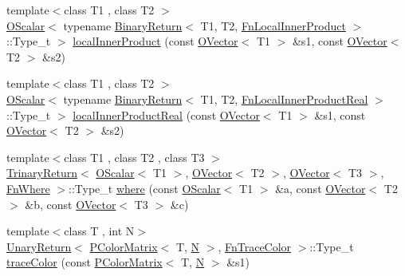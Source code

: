 \begin{DoxyCompactItemize}
\item 
{\footnotesize template$<$class T1 , class T2 $>$ }\\\mbox{\hyperlink{classENSEM_1_1OScalar}{O\+Scalar}}$<$ typename \mbox{\hyperlink{structENSEM_1_1BinaryReturn}{Binary\+Return}}$<$ T1, T2, \mbox{\hyperlink{structENSEM_1_1FnLocalInnerProduct}{Fn\+Local\+Inner\+Product}} $>$\+::Type\+\_\+t $>$ \mbox{\hyperlink{group__obsvector_gad915d71f08c700574f01f93a9689eb82}{local\+Inner\+Product}} (const \mbox{\hyperlink{classENSEM_1_1OVector}{O\+Vector}}$<$ T1 $>$ \&s1, const \mbox{\hyperlink{classENSEM_1_1OVector}{O\+Vector}}$<$ T2 $>$ \&s2)
\item 
{\footnotesize template$<$class T1 , class T2 $>$ }\\\mbox{\hyperlink{classENSEM_1_1OScalar}{O\+Scalar}}$<$ typename \mbox{\hyperlink{structENSEM_1_1BinaryReturn}{Binary\+Return}}$<$ T1, T2, \mbox{\hyperlink{structENSEM_1_1FnLocalInnerProductReal}{Fn\+Local\+Inner\+Product\+Real}} $>$\+::Type\+\_\+t $>$ \mbox{\hyperlink{group__obsvector_ga1a740c7927429957c8bc0b75d070bb71}{local\+Inner\+Product\+Real}} (const \mbox{\hyperlink{classENSEM_1_1OVector}{O\+Vector}}$<$ T1 $>$ \&s1, const \mbox{\hyperlink{classENSEM_1_1OVector}{O\+Vector}}$<$ T2 $>$ \&s2)
\item 
{\footnotesize template$<$class T1 , class T2 , class T3 $>$ }\\\mbox{\hyperlink{structENSEM_1_1TrinaryReturn}{Trinary\+Return}}$<$ \mbox{\hyperlink{classENSEM_1_1OScalar}{O\+Scalar}}$<$ T1 $>$, \mbox{\hyperlink{classENSEM_1_1OVector}{O\+Vector}}$<$ T2 $>$, \mbox{\hyperlink{classENSEM_1_1OVector}{O\+Vector}}$<$ T3 $>$, \mbox{\hyperlink{structENSEM_1_1FnWhere}{Fn\+Where}} $>$\+::Type\+\_\+t \mbox{\hyperlink{group__obsvector_ga0995058bdfadea43373e7142180780a1}{where}} (const \mbox{\hyperlink{classENSEM_1_1OScalar}{O\+Scalar}}$<$ T1 $>$ \&a, const \mbox{\hyperlink{classENSEM_1_1OVector}{O\+Vector}}$<$ T2 $>$ \&b, const \mbox{\hyperlink{classENSEM_1_1OVector}{O\+Vector}}$<$ T3 $>$ \&c)
\item 
{\footnotesize template$<$class T , int N$>$ }\\\mbox{\hyperlink{structENSEM_1_1UnaryReturn}{Unary\+Return}}$<$ \mbox{\hyperlink{classENSEM_1_1PColorMatrix}{P\+Color\+Matrix}}$<$ T, \mbox{\hyperlink{operator__name__util_8cc_a7722c8ecbb62d99aee7ce68b1752f337}{N}} $>$, \mbox{\hyperlink{structENSEM_1_1FnTraceColor}{Fn\+Trace\+Color}} $>$\+::Type\+\_\+t \mbox{\hyperlink{group__primcolormatrix_ga00fd94578bee0c90e298c41c144c15ee}{trace\+Color}} (const \mbox{\hyperlink{classENSEM_1_1PColorMatrix}{P\+Color\+Matrix}}$<$ T, \mbox{\hyperlink{operator__name__util_8cc_a7722c8ecbb62d99aee7ce68b1752f337}{N}} $>$ \&s1)

\end{DoxyCompactItemize}
